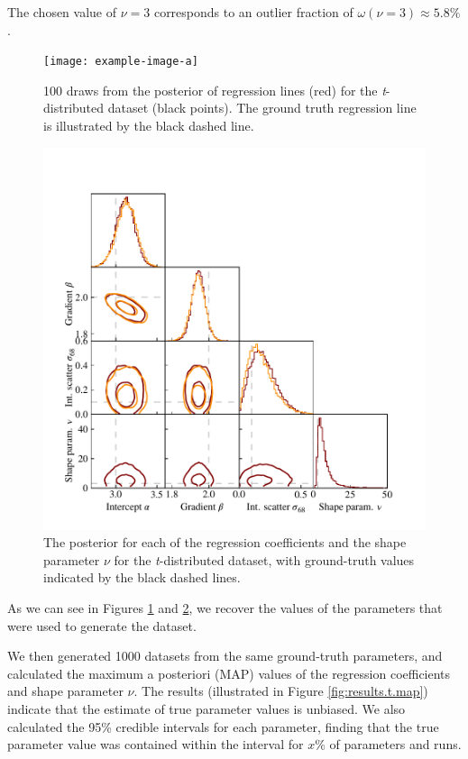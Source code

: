 \documentclass[fleqn,usenatbib]{mnras}
\begin{document}
The chosen value of $\nu = 3$ corresponds to an outlier fraction of $\omega(\nu = 3)
\approx 5.8 \%$.

\begin{figure}
    \texttt{[image: example-image-a]}
    \caption{{\color{red} 100} draws from the posterior of regression lines
    (red) for the \textit{t}-distributed dataset (black points). The ground
    truth regression line is illustrated by the black dashed line.}
    \label{fig:results.t.regression}
\end{figure}

\begin{figure}
    \includegraphics[width=\columnwidth]{graphics/corner_t.pdf}
    \caption{The posterior for each of the regression coefficients and the shape
    parameter $\nu$ for the \textit{t}-distributed dataset, with ground-truth
    values indicated by the black dashed lines.}
    \label{fig:results.t.corner}
\end{figure}

As we can see in Figures \ref{fig:results.t.regression} and
\ref{fig:results.t.corner}, we recover the values of the parameters that were
used to generate the dataset.

We then generated 1000 datasets from the same ground-truth parameters, and
calculated the maximum a posteriori (MAP) values of the regression coefficients
and shape parameter $\nu$. The results (illustrated in Figure
\ref{fig:results.t.map}) indicate that the estimate of true parameter values is
unbiased.{
\color{red} We also calculated the 95\% credible intervals for each parameter,
finding that the true parameter value was contained within the interval for
$x$\% of parameters and runs.
}
\end{document}
